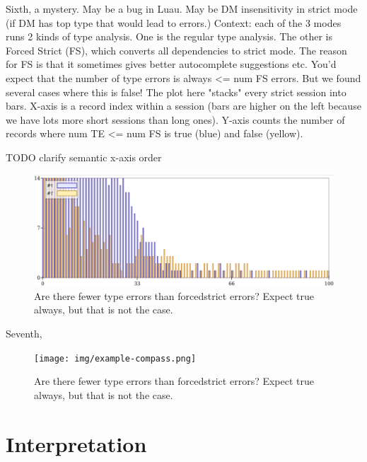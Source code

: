 \documentclass[english,submission,cleveref]{programming}
\begin{document}
Sixth, a mystery. May be a bug in Luau.
May be DM insensitivity in strict mode
(if DM has top type that would lead to errors.)
Context: each of the 3 modes runs 2 kinds of type analysis. One is the regular
type analysis. The other is Forced Strict (FS), which converts all dependencies
to strict mode. The reason for FS is that it sometimes gives better
autocomplete suggestions etc.
You'd expect that the number of type errors is always <= num FS errors. But we
found several cases where this is false!
The plot here "stacks" every strict session into bars. X-axis is a record index
within a session (bars are higher on the left because we have lots more short
sessions than long ones). Y-axis counts the number of records where num TE <= num FS
is true (blue) and false (yellow).

TODO clarify semantic x-axis order


\begin{figure}[t]
  \includegraphics[width=0.8\columnwidth]{img/example-tefs.png}
  \caption{Are there fewer type errors than forcedstrict errors? Expect true always, but that is not the case.}
  \label{f:tefs}
\end{figure}

Seventh, 


\begin{figure}[t]
  \texttt{[image: img/example-compass.png]}
  \caption{Are there fewer type errors than forcedstrict errors? Expect true always, but that is not the case.}
  \label{f:tefs}
\end{figure}


\section{Interpretation}
\end{document}
